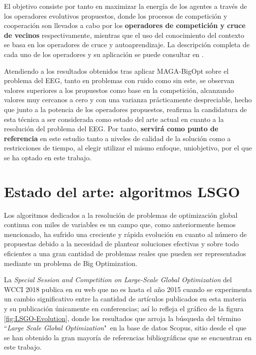 El objetivo consiste por tanto en maximizar la energía de los agentes a través de los operadores evolutivos propuestos, donde los procesos de competición y cooperación son llevados a cabo por los \textbf{operadores de competición y cruce de vecinos} respectivamente, mientras que el uso del conocimiento del contexto se basa en los operadores de cruce y autoaprendizaje. La descripción completa de cada uno de los operadores y su aplicación se puede consultar en \cite{MAGA-BigOpt}.

Atendiendo a los resultados obtenidos tras aplicar MAGA-BigOpt sobre el problema del EEG, tanto en problemas con ruido como sin este, se observan valores superiores a los propuestos como base en la competición, alcanzando valores muy cercanos a cero y con una varianza prácticamente despreciable, hecho que junto a la potencia de los operadores propuestos, reafirma la candidatura de esta técnica a ser considerada como estado del arte actual en cuanto a la resolución del problema del EEG. Por tanto, \textbf{servirá como punto de referencia} en este estudio tanto a niveles de calidad de la solución como a restricciones de tiempo, al elegir utilizar el mismo enfoque, uniobjetivo, por el que se ha optado en este trabajo.

\section{Estado del arte: algoritmos LSGO}

Los algoritmos dedicados a la resolución de problemas de optimización global continua con miles de variables es un campo que, como anteriormente hemos mencionado, ha sufrido una creciente y rápida evolución en cuanto al número de propuestas debido a la necesidad de plantear soluciones efectivas y sobre todo eficientes a una gran cantidad de problemas reales que pueden ser representados mediante un problema de Big Optimization.

La \textit{Special Session and Competition on Large-Scale Global Optimization} del WCCI 2018\cite{WCCI-SHADEILS} publica en su web que no es hasta el año 2015 cuando se experimenta un cambio significativo entre la cantidad de artículos publicados en esta materia y su publicación únicamente en conferencias; así lo refleja el gráfico de la figura \ref{fig:LSGO-Evolution}, donde los resultados que arroja la búsqueda del término ``\textit{Large Scale Global Optimization}"\ en la base de datos Scopus\cite{SCOPUS}, sitio desde el que se han obtenido la gran mayoría de referencias bibliográficas que se encuentran en este trabajo.

